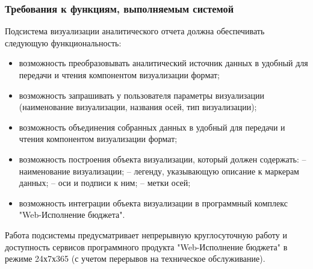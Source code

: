 \documentclass[a4paper]{extarticle}
\numberwithin{equation}{section}
\begin{document}
\subsubsection{Требования к функциям, выполняемым системой}
Подсистема визуализации аналитического отчета должна обеспечивать следующую функциональность:\par
\begin{itemize}
  \item возможность преобразовывать аналитический источник данных в удобный для передачи и чтения компонентом визуализации формат;
  \item возможность запрашивать у пользователя параметры визуализации (наименование визуализации, названия осей, тип визуализации);
  \item возможность объединения собранных данных в удобный для передачи и чтения компонентом визуализации формат;
  \item возможность построения объекта визуализации, который должен содержать:\newline
    	\hspace*{2.5cm} – наименование визуализации;\newline
        \hspace*{2.5cm} – легенду, указывающую описание к маркерам данных;\newline
    	\hspace*{2.5cm} – оси и подписи к ним;\newline
        \hspace*{2.5cm} – метки осей;
  \item возможность интеграции объекта визуализации в программный комплекс "Web-Исполнение бюджета".
\end{itemize}\par
Работа подсистемы предусматривает непрерывную круглосуточную работу и доступность сервисов программного продукта "Web-Исполнение бюджета" в режиме 24х7х365 (с учетом перерывов на техническое обслуживание).
\end{document}
